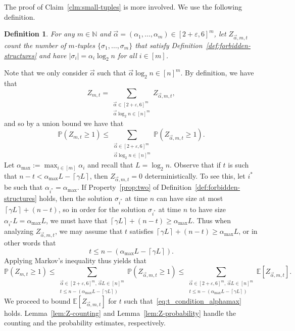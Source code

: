 \documentclass[11pt]{article}
\theoremstyle{plain}
\newtheorem{definition}{Definition}
\theoremstyle{definition}
\theoremstyle{remark}
\newcommand{\avec}{\vec{\alpha}}
\newcommand{\E}{\mathbb{E}}
\newcommand{\N}{\mathbb{N}}
\newcommand{\eps}{\varepsilon}
\renewcommand{\Pr}{\mathbb{P}}
\begin{document}
The proof of Claim~\ref{clm:small-tuples} is more involved. We use the following definition.
\begin{definition}\label{def:auxiliary-Z}
    For any $m \in \N$ and $\avec = (\alpha_1, \dots, \alpha_m) \in [2 + \eps, 6]^m$, let $Z_{\avec, m, t}$ count the number of $m$-tuples $\{\sigma_1, \dots, \sigma_m\}$ that satisfy Definition~\ref{def:forbidden-structures} and have $|\sigma_i| = \alpha_i \log_2 n$ for all $i \in [m]$.
\end{definition}
Note that we only consider $\avec$ such that $\avec \log_2 n \in [n]^m$. 
By definition, we have that 
\[
Z_{m,t} = \sum_{\substack{\avec \in [2+\eps, 6]^m \\ \avec \log_2 n \in [n]^m}} Z_{\avec, m, t},
\]
and so by a union bound we have that 
\[
\Pr(Z_{m,t} \geq 1) 
\leq \sum_{\substack{\avec \in [2+\eps, 6]^m \\ \avec \log_2 n \in [n]^m}} \Pr \left( Z_{\avec, m, t} \geq 1 \right).
\] 
Let $\alpha_{\max} := \max_{i \in [m]} \alpha_{i}$ 
and recall that $L = \log_{2} n$. 
Observe that if $t$ is such that 
$n-t < \alpha_{\max} L - \left\lceil \gamma L \right\rceil$, 
then 
$Z_{\avec, m, t} = 0$ deterministically. 
To see this, let $i^{*}$ be such that $\alpha_{i^{*}} = \alpha_{\max}$. 
If Property~\ref{prop:two} of Definition~\ref{def:forbidden-structures} holds, 
then the solution $\sigma_{i^{*}}$ at time $n$ can have size at most 
$\left\lceil \gamma L \right\rceil + (n-t)$, 
so in order for the solution $\sigma_{i^{*}}$ at time $n$ to have size $\alpha_{i^{*}} L = \alpha_{\max} L$, 
we must have that 
$\left\lceil \gamma L \right\rceil + (n-t) \geq \alpha_{\max} L$.
Thus when analyzing $Z_{\avec, m, t}$, we may assume that $t$ satisfies 
$\left\lceil \gamma L \right\rceil + (n-t) \geq \alpha_{\max} L$, 
or in other words that 
\begin{equation}\label{eq:t_condition_alphamax}
t \leq n - (\alpha_{\max} L - \left\lceil \gamma L \right\rceil).
\end{equation}
Applying Markov's inequality thus yields that 
\begin{equation}\label{eq:Z_bound}
    \Pr(Z_{m,t} \geq 1) 
    \leq \sum_{\substack{\avec \in [2+\eps, 6]^m, \, \avec L \in [n]^m \\ t \leq n - (\alpha_{\max} L - \left\lceil \gamma L \right\rceil)}} \Pr \left( Z_{\avec, m, t} \geq 1 \right)
    \leq \sum_{\substack{\avec \in [2+\eps, 6]^m, \, \avec L \in [n]^m \\ t \leq n - (\alpha_{\max} L - \left\lceil \gamma L \right\rceil)}} \E \left[Z_{\avec, m, t} \right].
\end{equation}
We proceed to bound $\E \left[ Z_{\avec, m, t} \right]$ for $t$ such that~\eqref{eq:t_condition_alphamax} holds. 
Lemma~\ref{lem:Z-counting} and Lemma~\ref{lem:Z-probability} handle the counting and the probability estimates, respectively.
\end{document}
